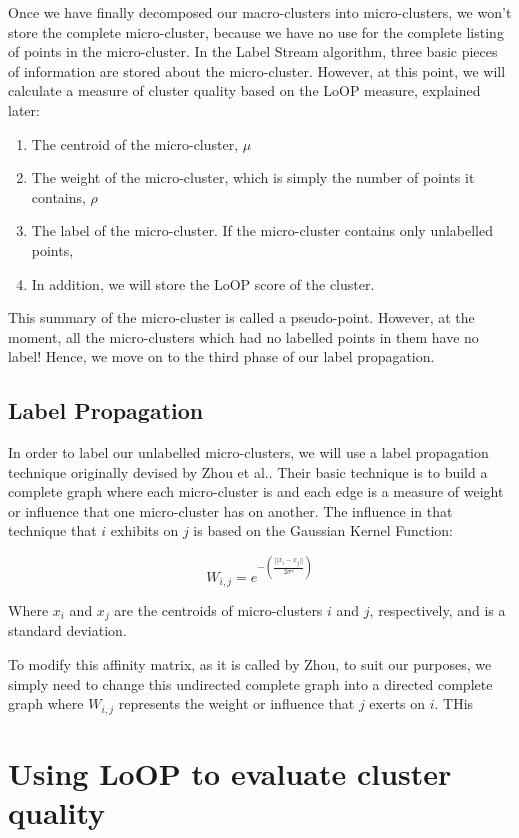 \documentclass[12pt,a4paper,oneside]{report}
\begin{document}
Once we have finally decomposed our macro-clusters into micro-clusters, we won't store the complete micro-cluster, because we have no use for the complete listing of points in the micro-cluster. In the Label Stream algorithm, three basic pieces of information are stored about the micro-cluster. However, at this point, we will calculate a measure of cluster quality based on the LoOP measure, explained later:
\begin{enumerate}
\item The centroid of the micro-cluster, \(\mu\)
\item The weight of the micro-cluster, which is simply the number of points it contains, \(\rho\)
\item The label of the micro-cluster. If the micro-cluster contains only unlabelled points,  
\item In addition, we will store the LoOP score of the cluster. 
\end{enumerate}

This summary of the micro-cluster is called a pseudo-point. However, at the moment, all the micro-clusters which had no labelled points in them have no label! Hence, we move on to the third phase of our label propagation. 

\subsection{Label Propagation}

In order to label our unlabelled micro-clusters, we will use a label propagation technique originally devised by Zhou et al.\cite{LabProp}. Their basic technique is to build a complete graph where each micro-cluster is and each edge is a measure of weight or influence that one micro-cluster has on another. The influence in that technique that \(i\) exhibits on \(j\) is based on the Gaussian Kernel Function:

\[W_{i,j} = e^{-(\frac{||x_i-x_j||}{2\sigma^2})}\]

Where \(x_i\) and \(x_j\) are the centroids of micro-clusters \(i\) and \(j\), respectively, and \sigma is a standard deviation. 

To modify this affinity matrix, as it is called by Zhou, to suit our purposes, we simply need to change this undirected complete graph into a directed complete graph where \(W_{i,j}\) represents the weight or influence that \(j\) exerts on \(i\). THis 

\section{Using LoOP to evaluate cluster quality}
\end{document}
